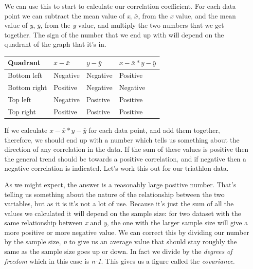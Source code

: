 \documentclass[
]{book}
\newenvironment{Shaded}{\begin{snugshade}}{\end{snugshade}}
\newcommand{\DecValTok}[1]{\textcolor[rgb]{0.00,0.00,0.81}{#1}}
\newcommand{\FloatTok}[1]{\textcolor[rgb]{0.00,0.00,0.81}{#1}}
\newcommand{\KeywordTok}[1]{\textcolor[rgb]{0.13,0.29,0.53}{\textbf{#1}}}
\newcommand{\NormalTok}[1]{#1}
\newcommand{\OperatorTok}[1]{\textcolor[rgb]{0.81,0.36,0.00}{\textbf{#1}}}
\newcommand{\StringTok}[1]{\textcolor[rgb]{0.31,0.60,0.02}{#1}}
\begin{document}
We can use this to start to calculate our correlation coefficient. For each data point we can subtract the mean value of \emph{x}, \(\bar{x}\), from the \emph{x} value, and the mean value of \emph{y}, \(\bar{y}\), from the \emph{y} value, and multiply the two numbers that we get together. The sign of the number that we end up with will depend on the quadrant of the graph that it's in.

\begin{longtable}[]{@{}llll@{}}
\toprule
Quadrant & \(x - \bar{x}\) & \(y-\bar{y}\) & \(x - \bar{x} * y - \bar{y}\)\tabularnewline
\midrule
\endhead
Bottom left & Negative & Negative & Positive\tabularnewline
Bottom right & Positive & Negative & Negative\tabularnewline
Top left & Negative & Positive & Positive\tabularnewline
Top right & Positive & Positive & Positive\tabularnewline
\bottomrule
\end{longtable}

If we calculate \(x - \bar{x} * y - \bar{y}\) for each data point, and add them together, therefore, we should end up with a number which tells us something about the direction of any correlation in the data. If the sum of these values is positive then the general trend should be towards a positive correlation, and if negative then a negative correlation is indicated. Let's work this out for our triathlon data.

\begin{Shaded}
\end{Shaded}

As we might expect, the answer is a reasonably large positive number. That's telling us something about the nature of the relationship between the two variables, but as it is it's not a lot of use. Because it's just the sum of all the values we calculated it will depend on the sample size: for two dataset with the same relationship between \emph{x} and \emph{y}, the one with the larger sample size will give a more positive or more negative value. We can correct this by dividing our number by the sample size, \emph{n} to give us an average value that should stay roughly the same as the sample size goes up or down. In fact we divide by the \emph{degrees of freedom} which in this case is \emph{n-1}. This gives us a figure called the \emph{covariance}.
\end{document}
